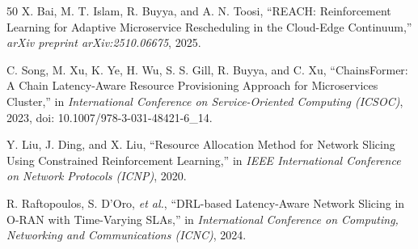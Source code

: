 \documentclass[conference]{IEEEtran}
\begin{document}
\begin{thebibliography}{50}
 X. Bai, M. T. Islam, R. Buyya, and A. N. Toosi, ``REACH: Reinforcement Learning for Adaptive Microservice Rescheduling in the Cloud-Edge Continuum,'' \emph{arXiv preprint arXiv:2510.06675}, 2025.

 C. Song, M. Xu, K. Ye, H. Wu, S. S. Gill, R. Buyya, and C. Xu, ``ChainsFormer: A Chain Latency-Aware Resource Provisioning Approach for Microservices Cluster,'' in \emph{International Conference on Service-Oriented Computing (ICSOC)}, 2023, doi: 10.1007/978-3-031-48421-6\_14.

 Y. Liu, J. Ding, and X. Liu, ``Resource Allocation Method for Network Slicing Using Constrained Reinforcement Learning,'' in \emph{IEEE International Conference on Network Protocols (ICNP)}, 2020.

 R. Raftopoulos, S. D'Oro, \emph{et al.}, ``DRL-based Latency-Aware Network Slicing in O-RAN with Time-Varying SLAs,'' in \emph{International Conference on Computing, Networking and Communications (ICNC)}, 2024.

\end{thebibliography}
\end{document}
